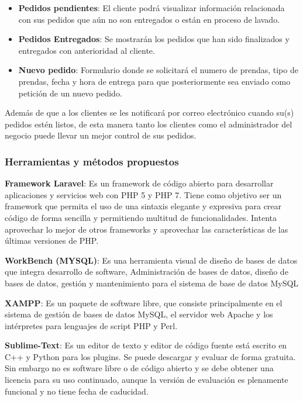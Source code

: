 \begin{itemize}
\item \textbf{Pedidos pendientes}: El cliente podrá visualizar información relacionada con sus pedidos que aún no son entregados o están en proceso de lavado.

\item \textbf{Pedidos Entregados}: Se mostrarán los pedidos que han sido finalizados y entregados con anterioridad al cliente.

\item \textbf{Nuevo pedido}: Formulario donde se solicitará el numero de prendas, tipo de prendas, fecha y hora de entrega para que posteriormente sea enviado como petición de un nuevo pedido.
\end{itemize}



Además de que a los clientes se les notificará por correo electrónico cuando su(s) pedidos estén listos, de esta manera tanto los clientes como el administrador del negocio puede llevar un mejor control de sus pedidos.


\subsubsection{Herramientas y métodos propuestos}


\textbf{Framework Laravel}: Es un framework de código abierto para desarrollar aplicaciones y servicios web con PHP 5 y PHP 7. Tiene como objetivo ser un framework que permita el uso de una sintaxis elegante y expresiva para crear código de forma sencilla y permitiendo multitud de funcionalidades. Intenta aprovechar lo mejor de otros frameworks y aprovechar las características de las últimas versiones de PHP.

\textbf{WorkBench (MYSQL)}: Es una herramienta visual de diseño de bases de datos que integra desarrollo de software, Administración de bases de datos, diseño de bases de datos, gestión y mantenimiento para el sistema de base de datos MySQL

\textbf{XAMPP}: Es un paquete de software libre, que consiste principalmente en el sistema de gestión de bases de datos MySQL, el servidor web Apache y los intérpretes para lenguajes de script PHP y Perl.

\textbf{Sublime-Text}:  Es un editor de texto y editor de código fuente está escrito en C++ y Python para los plugins. Se puede descargar y evaluar de forma gratuita. Sin embargo no es software libre o de código abierto y se debe obtener una licencia para su uso continuado, aunque la versión de evaluación es plenamente funcional y no tiene fecha de caducidad.

